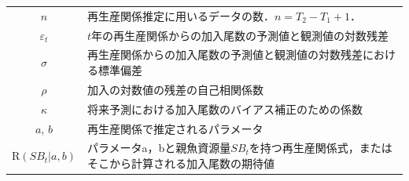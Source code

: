 \documentclass[11pt]{jsarticle}
\begin{document}
\begin{table}[h]
\begin{tabular}{cp{11cm}}
    $n$ & 再生産関係推定に用いるデータの数．$n=T_2-T_1+1$．\\    
    $\varepsilon_t$  & $t$年の再生産関係からの加入尾数の予測値と観測値の対数残差\\
    $\sigma$  & 再生産関係からの加入尾数の予測値と観測値の対数残差における標準偏差\\
    $\rho$  & 加入の対数値の残差の自己相関係数\\
    $\kappa$  & 将来予測における加入尾数のバイアス補正のための係数\\    
    $a$, $b$  & 再生産関係で推定されるパラメータ \\  %
    $\mathrm{R}(S\!B_{t}|a,b)$ &  パラメータa，bと親魚資源量$S\!B_{t}$を持つ再生産関係式，またはそこから計算される加入尾数の期待値　\\   \hline
  \end{tabular}
  \label{table_definition} 
\end{table}
\end{document}

